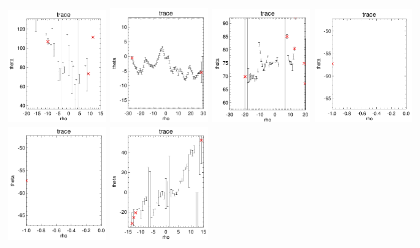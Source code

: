\documentclass[fleqn,usenatbib]{mnras}
\begin{document}
\begin{figure}
    \includegraphics[width=0.23\textwidth]{Images/trace-plots/trace-plots-cpsb-controls/9048-6101.png}
    \includegraphics[width=0.23\textwidth]{Images/trace-plots/trace-plots-cpsb-controls/9505-12701.png}   
    \includegraphics[width=0.23\textwidth]{Images/trace-plots/trace-plots-cpsb-controls/9509-9101.png}
    \includegraphics[width=0.23\textwidth]{Images/trace-plots/trace-plots-cpsb-controls/9870-12701.png}
    \includegraphics[width=0.23\textwidth]{Images/trace-plots/trace-plots-cpsb-controls/9871-1901.png}    
    \includegraphics[width=0.23\textwidth]{Images/trace-plots/trace-plots-cpsb-controls/9876-3701.png}

\end{figure}
\end{document}
